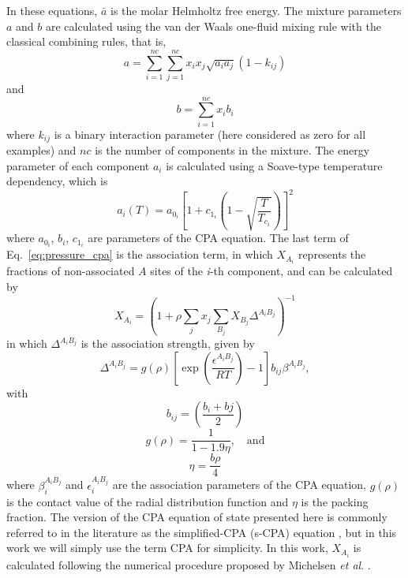 \documentclass[preprint,12pt,3p]{elsarticle}
\begin{document}
In these equations, $\bar{a}$ is the molar Helmholtz free energy.
The mixture parameters $a$ and $b$ are calculated using the van der Waals one-fluid mixing rule with the classical combining rules, that is,
\begin{equation}
a = \sum_{i=1}^{nc} \sum_{j=1}^{nc} x_{i}x_{j}\sqrt{a_{i}a_{j}}(1-k_{ij})
\end{equation}
and
\begin{equation}
b = \sum_{i=1}^{nc}x_{i}b_{i}
\end{equation}
where $k_{ij}$ is a binary interaction parameter (here considered as zero for all examples) and $nc$ is the number of components in the mixture.
The energy parameter of each component $a_{i}$ is calculated using a Soave-type temperature dependency, which is
\begin{equation}
a_{i}(T) = a_{0_{i}}\left[1+c_{1_{i}}\left(1-\sqrt{\frac{T}{T_{c_{i}}}}\right)\right]^2
\end{equation}
where $a_{0_{i}}$, $b_{i}$, $c_{1_{i}}$ are parameters of the CPA equation.
The last term of Eq.~\ref{eq:pressure_cpa} is the association term, in which $X_{A_{i}}$ represents the fractions of non-associated $A$ sites of the \textit{i}-th component, and can be calculated by
\begin{equation} \label{eq:frac_nb}
X_{A_{i}} = \left(1+\rho \sum_{j}x_{j} \sum_{B_{j}} X_{B_{j}} \Delta^{A_{i}B_{j}}\right)^{-1}
\end{equation}
in which $\Delta^{A_{i}B_{j}}$ is the association strength, given by
\begin{equation} \label{eq:delta_cpa}
\Delta^{A_{i}B_{j}} = g(\rho)\left[\exp\left(\frac{\epsilon^{A_{i}B_{j}}}{RT}\right)-1\right]b_{ij}\beta^{A_{i}B_{j}},
\end{equation}
with
\begin{equation} \label{eq:bij}
b_{ij} = \left(\frac{b_{i}+b{j}}{2}\right)
\end{equation}
\begin{equation} \label{eq:g_cpa}
g(\rho) = \frac{1}{1-1.9\eta}, \quad \text{and}
\end{equation}
\begin{equation} \label{eq:eta_cpa}
\eta = \frac{b\rho}{4}
\end{equation}
where $\beta_{i}^{A_{i}B_{j}}$ and $\epsilon_{i}^{A_{i}B_{j}}$ are the association parameters of the CPA equation, $g(\rho)$ is the contact value of the radial distribution function and $\eta$ is the packing fraction.
The version of the CPA equation of state presented here is commonly referred to in the literature as the simplified-CPA (s-CPA) equation \citep{kontogeorgis1999multicomponent}, but in this work we will simply use the term CPA for simplicity.
In this work, $X_{A_{i}}$ is calculated following the numerical procedure proposed by Michelsen \textit{et al}.
 \citep{michelsen2006robust}.
\end{document}
